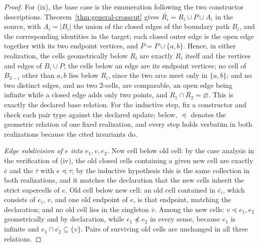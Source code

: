 \documentclass[11pt]{article}
\theoremstyle{mainplain}
\theoremstyle{mainroman}
\theoremstyle{definition}
\numberwithin{equation}{section}
\begin{document}
\begin{proof}
For (ix), the base case is the enumeration following the two
constructor descriptions. Theorem~\ref{thm:general-crosscut} gives
\(\overline{R_i}=R_i\cup P\cup A_i\) in the source, with
\(A_i=|B_i|\) the union of the closed edges of the boundary path
\(B_i\), and the corresponding identities in the target; each closed
outer edge is the open edge together with its two endpoint vertices,
and \(\overline P=P\cup\{a,b\}\). Hence, in either realization, the
cells geometrically below \(R_i\) are exactly \(R_i\) itself and the
vertices and edges of \(B_i\cup P\); the cells below an edge are its
endpoint vertices; no cell of \(B_{3-i}\) other than \(a,b\) lies
below \(R_i\), since the two arcs meet only in \(\{a,b\}\); and no two
distinct edges, and no two 2-cells, are comparable, an open edge being
infinite while a closed edge adds only two points, and
\(R_1\cap\overline{R_2}=\varnothing\). This is exactly the declared
base relation. For the inductive
step, fix a constructor and check each pair type against the declared
update; below, \(\preceq\) denotes the geometric relation of one fixed
realization, and every step holds verbatim in both realizations
because the cited invariants do.

\emph{Edge subdivision of \(e\) into \(e_1,v,e_2\).} New cell below
old cell: by the case analysis in the verification of (iv), the old
closed cells containing a given new cell are exactly \(\overline e\)
and the \(\overline\tau\) with \(e\preceq\tau\); by the inductive
hypothesis this is the same collection in both realizations, and it
matches the declaration that the new cells inherit the strict
supercells of \(e\). Old cell below new cell: an old cell contained in
\(\overline{e_i}\), which consists of \(e_i\), \(v\), and one old
endpoint of \(e\), is that endpoint, matching the declaration; and no
old cell lies in the singleton \(\overline v\). Among the new cells:
\(v\preceq e_1,e_2\) geometrically and by declaration, while
\(e_1\not\preceq e_2\) in every sense, because \(e_1\) is infinite and
\(e_1\cap\overline{e_2}\subseteq\{v\}\). Pairs of surviving old cells
are unchanged in all three relations.


\end{proof}
\end{document}
